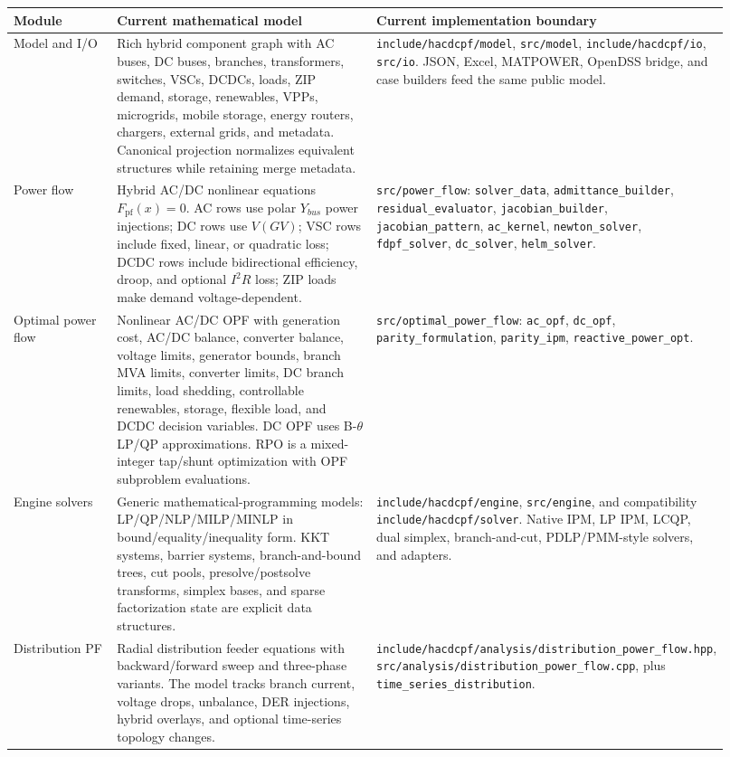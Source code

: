 \begin{longtable}{@{}L{0.16\linewidth}L{0.42\linewidth}L{0.34\linewidth}@{}}
\toprule
Module & Current mathematical model & Current implementation boundary \\
\midrule
\endhead
Model and I/O & Rich hybrid component graph with AC buses, DC buses, branches, transformers, switches, VSCs, DCDCs, loads, ZIP demand, storage, renewables, VPPs, microgrids, mobile storage, energy routers, chargers, external grids, and metadata.  Canonical projection normalizes equivalent structures while retaining merge metadata. & \texttt{include/hacdcpf/model}, \texttt{src/model}, \texttt{include/hacdcpf/io}, \texttt{src/io}.  JSON, Excel, MATPOWER, OpenDSS bridge, and case builders feed the same public model. \\
Power flow & Hybrid AC/DC nonlinear equations \(F_{\mathrm{pf}}(x)=0\).  AC rows use polar \(Y_{bus}\) power injections; DC rows use \(V(GV)\); VSC rows include fixed, linear, or quadratic loss; DCDC rows include bidirectional efficiency, droop, and optional \(I^2R\) loss; ZIP loads make demand voltage-dependent. & \texttt{src/power\_flow}: \texttt{solver\_data}, \texttt{admittance\_builder}, \texttt{residual\_evaluator}, \texttt{jacobian\_builder}, \texttt{jacobian\_pattern}, \texttt{ac\_kernel}, \texttt{newton\_solver}, \texttt{fdpf\_solver}, \texttt{dc\_solver}, \texttt{helm\_solver}. \\
Optimal power flow & Nonlinear AC/DC OPF with generation cost, AC/DC balance, converter balance, voltage limits, generator bounds, branch MVA limits, converter limits, DC branch limits, load shedding, controllable renewables, storage, flexible load, and DCDC decision variables.  DC OPF uses B-\(\theta\) LP/QP approximations.  RPO is a mixed-integer tap/shunt optimization with OPF subproblem evaluations. & \texttt{src/optimal\_power\_flow}: \texttt{ac\_opf}, \texttt{dc\_opf}, \texttt{parity\_formulation}, \texttt{parity\_ipm}, \texttt{reactive\_power\_opt}. \\
Engine solvers & Generic mathematical-programming models: LP/QP/NLP/MILP/MINLP in bound/equality/inequality form.  KKT systems, barrier systems, branch-and-bound trees, cut pools, presolve/postsolve transforms, simplex bases, and sparse factorization state are explicit data structures. & \texttt{include/hacdcpf/engine}, \texttt{src/engine}, and compatibility \texttt{include/hacdcpf/solver}.  Native IPM, LP IPM, LCQP, dual simplex, branch-and-cut, PDLP/PMM-style solvers, and adapters. \\
Distribution PF & Radial distribution feeder equations with backward/forward sweep and three-phase variants.  The model tracks branch current, voltage drops, unbalance, DER injections, hybrid overlays, and optional time-series topology changes. & \texttt{include/hacdcpf/analysis/distribution\_power\_flow.hpp}, \texttt{src/analysis/distribution\_power\_flow.cpp}, plus \texttt{time\_series\_distribution}. \\

\end{longtable}
